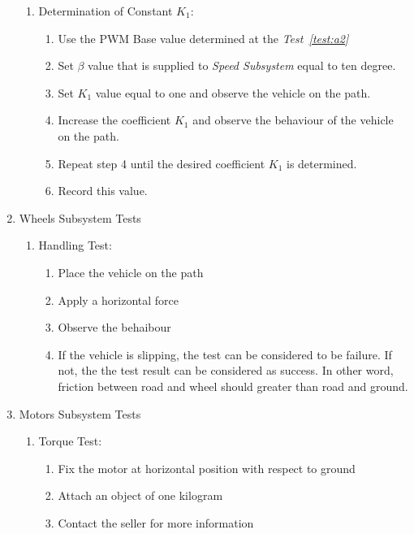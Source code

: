 \documentclass[a4paper,12pt]{article}
\begin{document}
\begin{enumerate}
\begin{enumerate}
		\item Determination of Constant $K_1$:
		\begin{enumerate}
			\item Use the PWM Base value determined at the \textit{Test~\ref{test:a2}}
			\item Set $\beta$ value that is supplied to \textit{Speed Subsystem} equal to ten degree.
			\item Set $K_1$ value equal to one and observe the vehicle on the path.
			\item Increase the coefficient $K_1$ and observe the behaviour of the vehicle on the path.
			\item Repeat step 4 until the desired coefficient $K_1$ is determined.
			\item Record this value.
		\end{enumerate}
		
		
		\end{enumerate}





		\item Wheels Subsystem Tests

		\begin{enumerate}
				\item {Handling Test:} 
				\begin{enumerate}
					\item  Place the vehicle on the path
					\item Apply a horizontal force
					\item Observe the behaibour 
					\item If the vehicle is slipping, the test can be considered to be failure. If not, the the test result can be considered as success. In other word, friction between road and wheel should greater than road and ground. 

				\end{enumerate}
		\end{enumerate}

		\item Motors Subsystem Tests

		\begin{enumerate}
				\item {Torque Test:} 
				\begin{enumerate}
					\item Fix the motor at horizontal position with respect to ground  
					\item Attach an object of one kilogram  
					\item Contact the seller for more information 
				\end{enumerate}
		\end{enumerate}
		

\end{enumerate}
\end{document}
